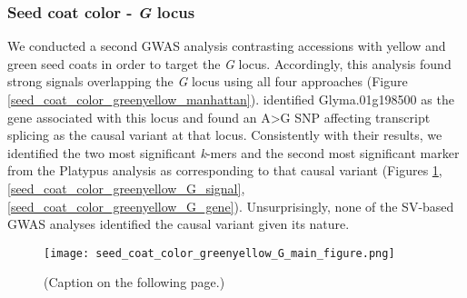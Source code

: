 \subsubsection*{Seed coat color - \textit{G} locus}
\label{sv-gwas-main-results-seed-coat-color-g}

We conducted a second GWAS analysis contrasting accessions with yellow and
green seed coats in order to target the \textit{G} locus. Accordingly, this
analysis found strong signals overlapping the \emph{G} locus using all four
approaches (Figure \ref{seed_coat_color_greenyellow_manhattan}).
\cite{wang2018} identified Glyma.01g198500 as the gene associated with
this locus and found an A>G SNP affecting transcript splicing as the causal
variant at that locus.  Consistently with their results, we identified the two
most significant \emph{k}-mers and the second most significant marker from the
Platypus analysis as corresponding to that causal variant (Figures
\ref{seed-coat-color-main-figure},
\ref{seed_coat_color_greenyellow_G_signal},
\ref{seed_coat_color_greenyellow_G_gene}). Unsurprisingly, none of the
SV-based GWAS analyses identified the causal variant given its nature.

\begin{figure}
	\centering
	\texttt{[image: seed\_coat\_color\_greenyellow\_G\_main\_figure.png]}
	\caption[Results of SNP/indel- and \textit{k}-mer-based GWAS at the
	\textit{G} locus for seed coat color]{(Caption on the following page.)}
	\label{seed-coat-color-main-figure}
\end{figure}

